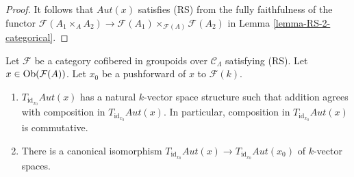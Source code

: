 \begin{proof}
It follows that $\mathit{Aut}(x)$ satisfies (RS) from the fully
faithfulness of the functor
$\mathcal{F}(A_1 \times_A A_2) \to
\mathcal{F}(A_1) \times_{\mathcal{F}(A)} \mathcal{F}(A_2)$ in
Lemma \ref{lemma-RS-2-categorical}.
\end{proof}

\begin{lemma}
\label{lemma-Aut-functor-tangent-space}
Let $\mathcal{F}$ be a category cofibered in groupoids over
$\mathcal{C}_\Lambda$ satisfying (RS). Let
$x \in \mathop{\mathrm{Ob}}\nolimits(\mathcal{F}(A))$. Let $x_0$ be a pushforward of $x$ to
$\mathcal{F}(k)$.
\begin{enumerate}
\item $T_{\text{id}_{x_0}} \mathit{Aut}(x)$ has a natural $k$-vector
space structure such that addition agrees with composition in
$T_{\text{id}_{x_0}} \mathit{Aut}(x)$. In particular, composition in
$T_{\text{id}_{x_0}} \mathit{Aut}(x)$ is commutative.
\item There is a canonical isomorphism
$T_{\text{id}_{x_0}} \mathit{Aut}(x) \to
T_{\text{id}_{x_0}} \mathit{Aut}(x_0)$
of $k$-vector spaces.
\end{enumerate}
\end{lemma}

